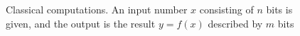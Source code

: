 \begin{figure}
\centering



\caption{Classical computations. An input number $x$ consisting of $n$ bits is given, and the output is the result $y = f\left(x\right)$ described by $m$ bits}
\label{figQuantCompClassComp}
\end{figure}
